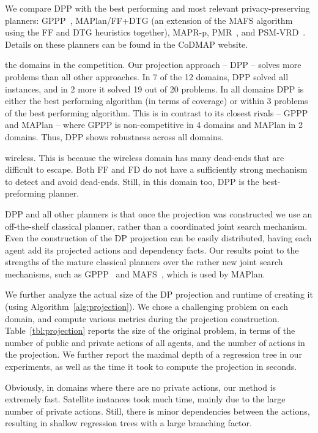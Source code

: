 \documentclass[letterpaper]{article}
\theoremstyle{definition}
\begin{document}
We compare DPP with the best performing and most relevant privacy-preserving planners: GPPP~\cite{maliah2015privacy}, MAPlan/FF+DTG (an extension of the MAFS algorithm~\cite{nissim2014distributed} using the FF and DTG heuristics together), MAPR-p, PMR~\cite{luis2014planMerging}, and PSM-VRD~\cite{tovzivcka2014generating,jakubuv2015multiagent}. Details on these planners can be found in the CoDMAP website.

 the domains in the competition. Our projection approach -- DPP -- solves more problems than all other approaches. In 7 of the 12 domains, DPP solved all instances, and in 2 more it solved 19 out of 20 problems. In all domains DPP is either the best performing algorithm (in terms of coverage) or within 3 problems of the best performing algorithm. This is in contrast to its closest rivals -- GPPP and MAPlan -- where GPPP is non-competitive in 4 domains and MAPlan in 2 domains. Thus, DPP shows robustness across all domains.


 wireless. This is because the wireless domain has many dead-ends that are difficult to escape. Both FF and FD do not have a sufficiently strong mechanism to detect and avoid dead-ends. Still, in this domain too, DPP is the best-preforming planner.

 DPP and all other planners is that once the projection was constructed we use an off-the-shelf classical planner, rather than a coordinated joint search mechanism. Even the construction of the DP projection can be easily distributed, having each agent add its projected actions and dependency facts.
Our results point to the strengths of the mature classical planners over the rather new joint search mechanisms, such as GPPP~\cite{maliah2014privacyPreserving} and MAFS~\cite{nissim2014distributed}, which is used by MAPlan.


We further analyze the actual size of the DP projection and runtime of creating it (using Algorithm~\ref{alg:projection}). We chose a challenging problem on each domain, and compute various metrics during the projection construction.  Table~\ref{tbl:projection} reports the size of the original problem, in terms of the number of public and private actions of all agents, and the number of actions in the projection. We further report the maximal depth of a regression tree in our experiments, as well as the time it took to compute the projection in seconds.

Obviously, in domains where there are no private actions, our method is extremely fast.
Satellite instances took much time, mainly due to the large number of private actions. Still, there is minor dependencies between the actions, resulting in shallow regression trees with a large branching factor.
\end{document}
